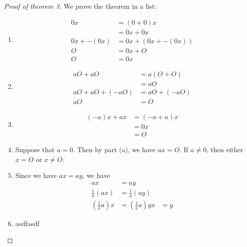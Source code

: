 \documentclass[main.tex]{subfiles}
\begin{document}
    \begin{proof}[Proof of theorem 3]
        We prove the theorem in a list:
        \begin{enumerate}
            \item \begin{align*}
                0x &= (0+0)x \\
                &= 0x + 0x \\
                0x + -(0x) &= 0x + (0x + -(0x)) \\
                O &= 0x + O \\
                O &= 0x
            \end{align*}
            \item \begin{align*}
                aO + aO &= a(O + O) \\
                &= aO \\
                aO + aO + (-aO) &= aO + (-aO) \\
                aO &= O 
            \end{align*}
            \item \begin{align*}
                (-a)x + ax &= (-a + a)x \\
                &= 0x \\
                &= O
            \end{align*}
            \item Suppose that $a=0$. Then by part (a), we have $ax = O$. If $a \neq 0$, then either $x = O$ or $x \neq O$. %
            \item Since we have $ax = ay$, we have
            \begin{align*}
                ax &= ay \\
                \frac1a(ax) &= \frac1a(ay) \\
                \left(\frac1aa\right)x &= \left(\frac1aa\right)y 
                x &= y
            \end{align*}
            \item asdfasdf 
        \end{enumerate}
    \end{proof}
\end{document}
